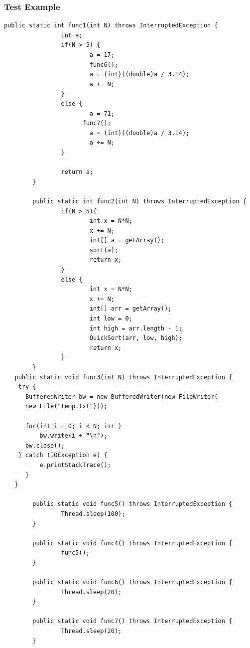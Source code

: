 \documentclass[11pt]{article}
\begin{document}
\subsubsection{Test Example}
\begin{lstlisting}
public static int func1(int N) throws InterruptedException {
                int a;
                if(N > 5) {
                        a = 17;
                        func6();
                        a = (int)((double)a / 3.14);
                        a += N;
                }
                else {
                        a = 71;
                      func7();
                        a = (int)((double)a / 3.14);
                        a += N;
                }

                return a;
        }

        public static int func2(int N) throws InterruptedException {
                if(N > 5){
                        int x = N*N;
                        x += N;
                        int[] a = getArray();
                        sort(a);
                        return x;
                }
                else {
                        int x = N*N;
                        x += N;
                        int[] arr = getArray();
                        int low = 0;
                        int high = arr.length - 1;
                        QuickSort(arr, low, high);
                        return x;
                }
        }
   public static void func3(int N) throws InterruptedException {
    try {
      BufferedWriter bw = new BufferedWriter(new FileWriter(
      new File("temp.txt")));

      for(int i = 0; i < N; i++ )
          bw.write(i + "\n");
      bw.close();
    } catch (IOException e) {
          e.printStackTrace();
      }
   }

        public static void func5() throws InterruptedException {
                Thread.sleep(100);
        }

        public static void func4() throws InterruptedException {
                func5();
        }

        public static void func6() throws InterruptedException {
                Thread.sleep(20);
        }

        public static void func7() throws InterruptedException {
                Thread.sleep(20);
        }
\end{lstlisting}
\end{document}
